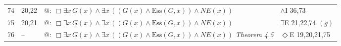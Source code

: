 {\begin{longtable}{@{}r>{\raggedright}p{}p{}>{\raggedright\arraybackslash}p{}@{}}
74 & 20,22 & $@:\ \Box \exists x\, G(x) \wedge \exists x\, ((G(x) \wedge \mathrm{Ess}(G,x)) \wedge \mathit{NE}(x))$ & $\wedge$I 36,73\\
75 & 20,21 & $@:\ \Box \exists x\, G(x) \wedge \exists x\, ((G(x) \wedge \mathrm{Ess}(G,x)) \wedge \mathit{NE}(x))$ & $\exists$E 21,22,74 $(g)$\\
76 & -- & $@:\ \Box \exists x\, G(x) \wedge \exists x\, ((G(x) \wedge \mathrm{Ess}(G,x)) \wedge \mathit{NE}(x))$ \hfill{\itshape Theorem 4.5} & $\Diamond$E 19,20,21,75\\
\bottomrule\end{longtable}}
